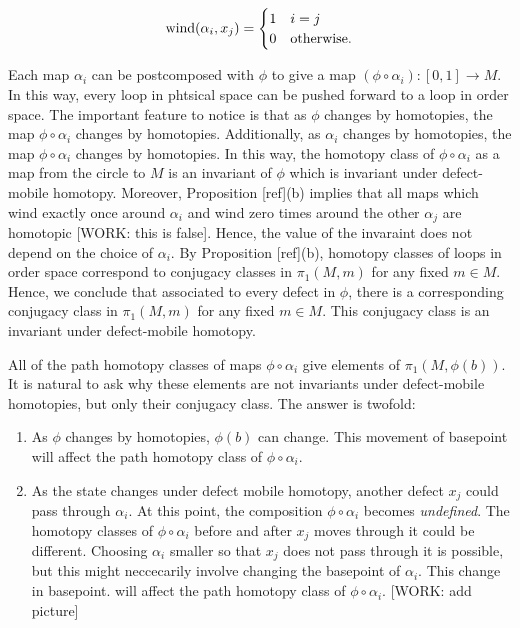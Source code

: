 \documentclass{article}
\theoremstyle{definition}
\numberwithin{figure}{section}
\begin{document}
$$\mathrm{wind}(\alpha_i,x_j)=
\begin{cases}
1 & i=j\\
0 & \text{otherwise}.
\end{cases}$$

Each map $\alpha_i$ can be postcomposed with $\phi$ to give a map $(\phi\circ \alpha_i): [0,1]\to M$. In this way, every loop in phtsical space can be pushed forward to a loop in order space. The important feature to notice is that as $\phi$ changes by homotopies, the map $\phi\circ \alpha_i$ changes by homotopies. Additionally, as $\alpha_i$ changes by homotopies, the map $\phi\circ \alpha_i$ changes by homotopies. In this way, the homotopy class of $\phi\circ \alpha_i$ as a map from the circle to $M$ is an invariant of $\phi$ which is invariant under defect-mobile homotopy. Moreover, Proposition [ref](b) implies that all maps which wind exactly once around $\alpha_i$ and wind zero times around the other $\alpha_j$ are homotopic [WORK: this is false]. Hence, the value of the invaraint does not depend on the choice of $\alpha_i$. By Proposition [ref](b), homotopy classes of loops in order space correspond to conjugacy classes in $\pi_1(M,m)$ for any fixed $m\in M$. Hence, we conclude that associated to every defect in $\phi$, there is a corresponding conjugacy class in $\pi_1(M,m)$ for any fixed $m\in M$. This conjugacy class is an invariant under defect-mobile homotopy.

All of the path homotopy classes of maps $\phi\circ \alpha_i$ give elements of $\pi_1(M,\phi(b))$. It is natural to ask why these elements are not invariants under defect-mobile homotopies, but only their conjugacy class. The answer is twofold:

\begin{enumerate}
\item As $\phi$ changes by homotopies, $\phi(b)$ can change. This movement of basepoint will affect the path homotopy class of $\phi\circ \alpha_i$.
\item As the state changes under defect mobile homotopy, another defect $x_j$ could pass through $\alpha_i$. At this point, the composition $\phi\circ \alpha_i$ becomes \textit{undefined}. The homotopy classes of $\phi\circ \alpha_i$ before and after $x_j$ moves through it could be different. Choosing $\alpha_i$ smaller so that $x_j$ does not pass through it is possible, but this might neccecarily involve changing the basepoint of $\alpha_i$. This change in basepoint. will affect the path homotopy class of $\phi\circ \alpha_i$. [WORK: add picture]
\end{enumerate}
\end{document}
